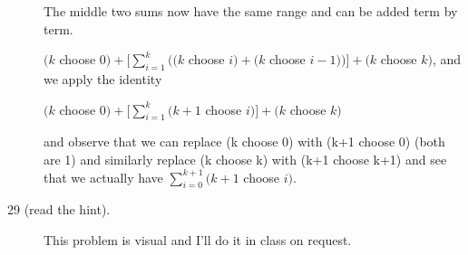 \documentclass[12pt]{article}
\begin{document}
\begin{description}
The middle two sums now have the same range and can be added term by term.

$(k$ choose $0) +[\sum_{i=1}^k ((k$ choose $i) + (k$ choose $i-1))] + (k$ choose $k)$, and we apply the identity

$(k$ choose $0) +[\sum_{i=1}^k (k+1$ choose $i)] + (k$ choose $k)$

and observe that we can replace (k choose 0) with (k+1 choose 0) (both are 1) and similarly replace (k choose k) with 
(k+1 choose k+1) and see that we actually have $\sum_{i=0}^{k+1} (k+1$ choose $i) $.




\item[29 (read the hint).]  This problem is visual and I'll do it in class on request.

\end{description}
\end{document}
